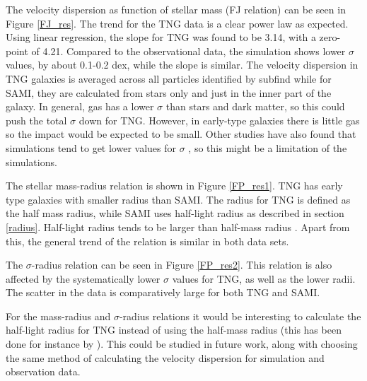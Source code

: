 The velocity dispersion as function of stellar mass (FJ relation) can be seen in Figure \ref{FJ_res}. The trend for the TNG data is a clear power law as expected. Using linear regression, the slope for TNG was found to be 3.14, with a zero-point of 4.21. Compared to the observational data, the simulation shows lower $\sigma$ values, by about 0.1-0.2 dex, while the slope is similar. The velocity dispersion in TNG galaxies is averaged across all particles identified by subfind while for SAMI, they are calculated from stars only and just in the inner part of the galaxy. In general, gas has a lower $\sigma$ than stars and dark matter, so this could push the total $\sigma$ down for TNG. However, in early-type galaxies there is little gas so the impact would be expected to be small. Other studies have also found that simulations tend to get lower values for $\sigma$ \parencite{Sande2018}, so this might be a limitation of the simulations.

The stellar mass-radius relation is shown in Figure \ref{FP_res1}. TNG has early type galaxies with smaller radius than SAMI. The radius for TNG is defined as the half mass radius, while SAMI uses half-light radius as described in section \ref{radius}. Half-light radius tends to be larger than half-mass radius \parencite{Sande2018}. Apart from this, the general trend of the relation is similar in both data sets.

The $\sigma$-radius relation can be seen in Figure \ref{FP_res2}. This relation is also affected by the systematically lower $\sigma$ values for TNG, as well as the lower radii. The scatter in the data is comparatively large for both TNG and SAMI.

For the mass-radius and $\sigma$-radius relations it would be interesting to calculate the half-light radius for TNG instead of using the half-mass radius (this has been done for instance by \textcite{Genel2017}). This could be studied in future work, along with choosing the same method of calculating the velocity dispersion for simulation and observation data.

